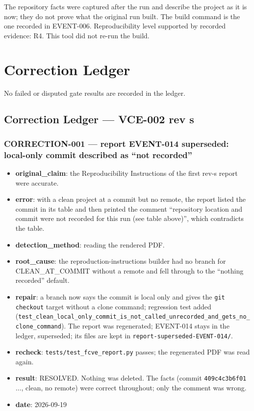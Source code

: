 \documentclass[11pt]{article}
\begin{document}
The repository facts were captured after the run and describe the project as it is now; they do not prove what the original run built. The build command is the one recorded in EVENT-006.
Reproducibility level supported by recorded evidence: R4. This tool did not re-run the build.
\section{Correction Ledger}
No failed or disputed gate results are recorded in the ledger.
\subsection*{Correction Ledger --- VCE-002 rev s}
\subsubsection*{CORRECTION-001 --- report EVENT-014 superseded: local-only commit described as ``not recorded''}
\begin{itemize}
\item \textbf{original\_claim}: the Reproducibility Instructions of the first rev-s report were accurate.
\item \textbf{error}: with a clean project at a commit but no remote, the report listed the commit in its table and then printed the comment ``repository location and commit were not recorded for this run (see table above)'', which contradicts the table.
\item \textbf{detection\_method}: reading the rendered PDF.
\item \textbf{root\_cause}: the reproduction-instructions builder had no branch for CLEAN\_AT\_COMMIT without a remote and fell through to the ``nothing recorded'' default.
\item \textbf{repair}: a branch now says the commit is local only and gives the \texttt{git checkout} target without a clone command; regression test added (\texttt{test\_clean\_local\_only\_commit\_is\_not\_called\_unrecorded\_and\_gets\_no\_clone\_command}). The report was regenerated; EVENT-014 stays in the ledger, superseded; its files are kept in \texttt{report-superseded-EVENT-014/}.
\item \textbf{recheck}: \texttt{tests/test\_fcve\_report.py} passes; the regenerated PDF was read again.
\item \textbf{result}: RESOLVED. Nothing was deleted. The facts (commit \texttt{409c4c3b6f01\ensuremath{\ldots}}, clean, no remote) were correct throughout; only the comment was wrong.
\item \textbf{date}: 2026-09-19
\end{itemize}
\end{document}

